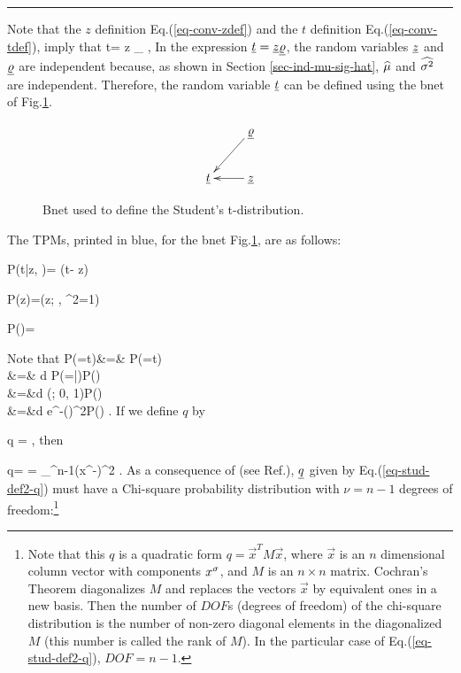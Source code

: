 \hrule{}

Note that the $z$ definition
Eq.(\ref{eq-conv-zdef})
and the $t$ definition
Eq.(\ref{eq-conv-tdef}),
imply that
\beq
t= z
_{\varrho}
\;,
\eeq
In the
expression $\rvt=\rvz\ul{\varrho}$,
the
 random variables
$\rvz$ and $\ul{\varrho}$
are independent
because, as shown in Section
\ref{sec-ind-mu-sig-hat},
 ${\widehat{\mu}}$
and ${\widehat{\sigma^2}}$
are independent.
Therefore, the random variable $\rvt$
can be defined using the bnet
of Fig.\ref{fig-stud-bnet}.

\begin{figure}[h!]
$$
\xymatrix{
&\ul{\varrho}\ar[ld]
\\
\rvt&\rvz\ar[l]
}
$$
\caption{Bnet used to define
the Student's t-distribution.}
\label{fig-stud-bnet}
\end{figure}
The TPMs, printed in blue,
for the bnet Fig.\ref{fig-stud-bnet},
are as follows:

\beq\color{blue}
P(t|z, \varrho)=
\delta(t- z\varrho)
\;\;\;
\eeq

\beq\color{blue}
P(z)=\caln(z; , \s^2=1)
\eeq

\beq\color{blue}
P(\varrho)=
\eeq

Note that
\beqa
P(\rvt=t)&=&
P(\rvz\ul{\varrho}=t)
\\
&=&
\int d\varrho\;
P(\rvz=|\varrho)P(\varrho)
\\
&=&\int d\varrho\;
\caln(; 0, 1)P(\varrho)
\\
&=&\int d\varrho\;
e^{-\;()^2}P(\varrho)
\;.
\eeqa
If we define $q$ by

\beq
q =
\;,
\label{eq-stud-def1-q}
\eeq
then

\beq
q=
=
\sum_{}^{n-1}(x^\s-\HAT{\mu})^2
\;.
\label{eq-stud-def2-q}
\eeq
As a consequence of
(see Ref.\cite{wiki-coch-theo}),
$\rvq$ given
by Eq.(\ref{eq-stud-def2-q}) must have
a Chi-square probability
distribution with $\nu=n-1$
degrees of freedom:\footnote{Note
that this $q$
is a quadratic form
$q=\vec{x}^T M \vec{x}$,
where $\vec{x}$ is an $n$ dimensional
column vector with components
$x^\sigma$,
and $M$ is an $n\times n$ matrix.
Cochran's Theorem
diagonalizes $M$
and replaces the
vectors $\vec{x}$
by equivalent ones in a new
basis.
Then the number
of $DOF$s (degrees of freedom)
of the chi-square distribution
is the number of non-zero
diagonal elements in
 the diagonalized $M$
(this
number is called the rank of $M$).
In the particular case of
Eq.(\ref{eq-stud-def2-q}),
$DOF=n-1$.}

